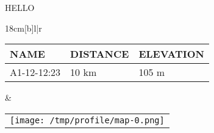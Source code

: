 \documentclass[english,ms,12pt]{memoir}
\begin{document}
HELLO

\begin{tabular*}{18cm}[b]{l|r}
  \hline
  \\
  \hline
  \vspace{0.5cm}
    \begin{tabular}{|l|l|l|}
      \hline
      NAME & DISTANCE & ELEVATION  \\
      \hline
      A1-12-12:23 & 10 km & 105 m \\
    \end{tabular}
    &
    \begin{tabular}{r}
      \texttt{[image: /tmp/profile/map-0.png]}
    \end{tabular}
\end{tabular*}
\end{document}
